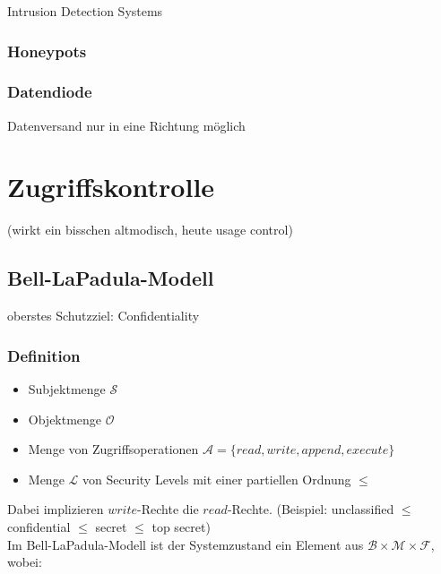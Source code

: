 \documentclass[a4paper,twoside,DIV15,BCOR12mm]{scrbook}
\begin{document}
Intrusion Detection Systems

\subsection{Honeypots}

\subsection{Datendiode}

Datenversand nur in eine Richtung möglich\\



\chapter{Zugriffskontrolle}

(wirkt ein bisschen altmodisch, heute usage control)

\section{Bell-LaPadula-Modell}

oberstes Schutzziel: Confidentiality

\subsection{Definition}

\begin{itemize}
	\item Subjektmenge $\mathcal{S}$
	\item Objektmenge $\mathcal{O}$
	\item Menge von Zugriffsoperationen $\mathcal{A} = \{ read, write, append, execute \}$
	\item Menge $\mathcal{L}$ von Security Levels mit einer partiellen Ordnung $\leq$
\end{itemize}

Dabei implizieren $write$-Rechte die $read$-Rechte. (Beispiel: unclassified $\leq$ confidential $\leq$ secret $\leq$ top secret)\\

Im Bell-LaPadula-Modell ist der Systemzustand ein Element aus $\mathcal{B} \times \mathcal{M} \times \mathcal{F}$, wobei:
\end{document}
